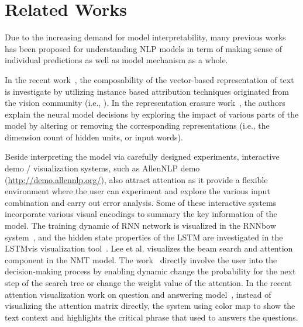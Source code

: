 \section{Related Works}
Due to the increasing demand for model interpretability, many previous works has been proposed for understanding NLP models in term of making sense of individual predictions as well as model mechanism as a whole. 

In the recent work~\cite{LiChenHovy2015}, the composability of the vector-based representation of text is investigate by utilizing instance based attribution techniques originated from the vision community (i.e., \cite{SimonyanVedaldiZisserman2013, ZeilerFergus2014, YosinskiCluneNguyen2015, OlahMordvintsevSchubert2017}). 
%
In the representation erasure work~\cite{li2016understanding}, the authors explain the neural model decisions by exploring the impact of various parts of the model by altering or removing the corresponding representations (i.e., the dimension count of hidden units, or input words). 

Beside interpreting the model via carefully designed experiments, interactive demo / visualization systems, such as AllenNLP demo (\url{http://demo.allennlp.org/}), also attract attention as it provide a flexible environment where the user can experiment and explore the various input combination and carry out error analysis.
%
Some of these interactive systems incorporate various visual encodings to summary the key information of the model.
%
The training dynamic of RNN network is visualized in the RNNbow system~\cite{CashmanPattersonMosca2017}, and the hidden state properties of the LSTM are investigated in the LSTMvis visualization tool~\cite{StrobeltGehrmannPfister2018}.
Lee et al. visualizes the beam search and attention component in the NMT model. The work~\cite{lee2017interactive} directly involve the user into the decision-making process by enabling dynamic change the probability for the next step of the search tree or change the weight value of the attention.
In the recent attention visualization work on question and answering model~\cite{ruckle2017end}, 
instead of visualizing the attention matrix directly, the system using color map to show the text context and highlights the critical phrase that used to answers the questions. %
%


